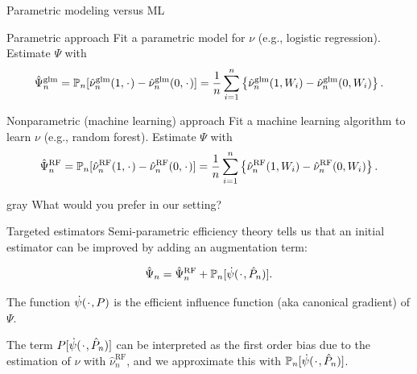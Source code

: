 \documentclass[smaller]{beamer}\usepackage{listings}
\newcommand{\blank}{\makebox[1ex]{\textbf{$\cdot$}}}
\newcommand{\1}{\mathds{1}}
\newcommand{\empmeas}{\ensuremath{\mathbb{P}_n}} %
\begin{document}
\begin{frame}[label={sec:orgf9b291e}]{Parametric modeling versus ML}
\small
\begin{block}{Parametric approach}
Fit a parametric model for \( \nu \) (e.g., logistic regression). Estimate
$\Psi$ with
\begin{equation*}
  \hat{\Psi}_n^{\text{glm}} =\empmeas{[\hat{\nu}_n^{\text{glm}}(1, \blank)- \hat{\nu}_n^{\text{glm}}(0,
    \blank)]}
  = \frac{1}{n}\sum_{i=1}^{n}
  \left\{
    \hat{\nu}_n^{\text{glm}}(1, W_i) - \hat{\nu}_n^{\text{glm}}(0, W_i)
  \right\}.
\end{equation*}
\end{block}


\begin{block}{Nonparametric (machine learning) approach}
Fit a machine learning algorithm to learn \( \nu \) (e.g., random forest).
Estimate $\Psi$ with
\begin{equation*}
  \hat{\Psi}_n^{\text{RF}} = \empmeas{[\hat{\nu}_n^{\text{RF}}(1, \blank)- \hat{\nu}_n^{\text{RF}}(0,
    \blank)]}
  = \frac{1}{n}\sum_{i=1}^{n}
  \left\{
    \hat{\nu}_n^{\text{RF}}(1, W_i) - \hat{\nu}_n^{\text{RF}}(0, W_i)
  \right\}.
\end{equation*}

\vspace{.4cm}


\begin{beamercolorbox}[rounded=true]{gray}
\centering \normalsize What would you prefer in our setting?
\end{beamercolorbox}
\end{block}
\end{frame}

\begin{frame}[label={sec:org2efa82c}]{Targeted estimators}
Semi-parametric efficiency theory tells us that an initial estimator can be
improved by adding an augmentation term:

\begin{equation*}
  \hat{\Psi}_n = \hat{\Psi}_n^{\text{RF}} + \empmeas{[\dot{\psi}(\blank, \hat{P}_n)]}.
\end{equation*}

\vfill

The function \(\dot{\psi}(\blank, P)\) is the \color{bblue}efficient influence
function \color{black} (aka \color{bblue}canonical gradient\color{black}) of
\(\Psi\).

\vfill

The term \(P{[\dot{\psi}(\blank, \hat{P}_n)]}\) can be interpreted as the
first order bias due to the estimation of \(\nu\) with \(\hat{\nu}_n^{\text{RF}}\), and we approximate this with \(\empmeas{[\dot{\psi}(\blank, \hat{P}_n)]}\).
\end{frame}
\end{document}
